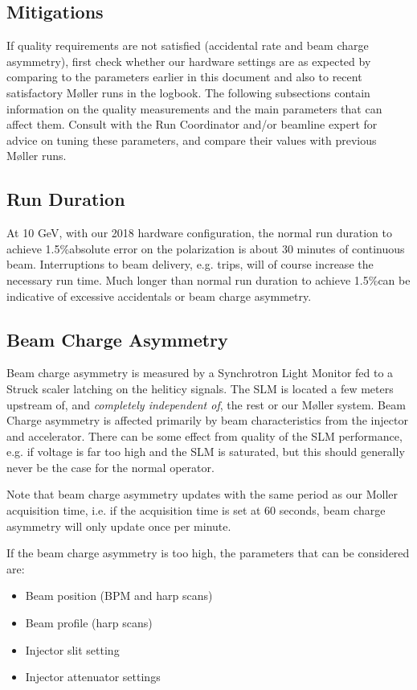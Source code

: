 \documentclass[amsmath,amssymb,notitlepage,12pt]{revtex4}
\newcommand{\easy}{1.5\%}
\begin{document}
\subsection{Mitigations}\label{sec:knobs}

If quality requirements are not satisfied (accidental rate and beam charge asymmetry), first check whether our hardware settings are as expected by comparing to the parameters earlier in this document and also to recent satisfactory M{\o}ller runs in the logbook.  The following subsections contain information on the quality measurements and the main parameters that can affect them.  Consult with the Run Coordinator and/or beamline expert for advice on tuning these parameters, and compare their values with previous M{\o}ller runs.

\subsection{Run Duration}
At 10 GeV, with our 2018 hardware configuration, the normal run duration to achieve \easy absolute error on the polarization is about 30 minutes of continuous beam.  Interruptions to beam delivery, e.g. trips, will of course increase the necessary run time.  Much longer than normal run duration to achieve \easy can be indicative of excessive accidentals or beam charge asymmetry.

\subsection{Beam Charge Asymmetry}
Beam charge asymmetry is measured by a Synchrotron Light Monitor fed to a Struck scaler latching on the heliticy signals.  The SLM is located a few meters upstream of, and {\em completely independent of}, the rest or our M{\o}ller system.  Beam Charge asymmetry is affected primarily by beam characteristics from the injector and accelerator.  There can be some effect from quality of the SLM performance, e.g. if voltage is far too high and the SLM is saturated, but this should generally never be the case for the normal operator.

Note that beam charge asymmetry updates with the same period as our Moller acquisition time, i.e. if the acquisition time is set at 60 seconds, beam charge asymmetry will only update once per minute.

If the beam charge asymmetry is too high, the parameters that can be considered are:
\begin{itemize}
\vspace{-4mm}\item Beam position (BPM and harp scans)
\vspace{-4mm}\item Beam profile (harp scans)
\vspace{-4mm}\item Injector slit setting
\vspace{-4mm}\item Injector attenuator settings
\end{itemize}
\end{document}
